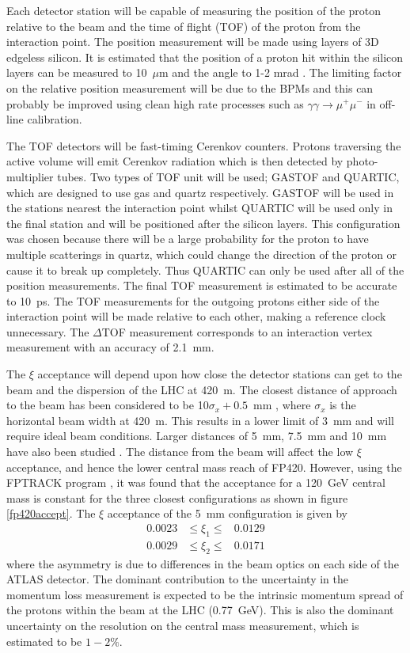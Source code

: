 Each detector station will be capable of measuring the position of the proton relative to the beam and the time of flight (TOF) of the proton from the interaction point.
The position measurement will be made using layers of 3D edgeless silicon. It is estimated that the position of a proton hit within the silicon layers can be measured to 10~$\mu$m and the angle to 1-2 mrad \cite{Cox:2005tb}. The limiting factor on the relative position measurement will be due to the BPMs and this can probably be improved using clean high rate processes such as $\gamma \gamma \rightarrow \mu^{+} \mu^{-}$ in off-line calibration.

The TOF detectors will be fast-timing Cerenkov counters. Protons traversing the active volume will emit Cerenkov radiation which is then detected by photo-multiplier tubes. Two types of TOF unit will be used; GASTOF and QUARTIC, which are designed to use gas and quartz respectively. GASTOF will be used in the stations nearest the interaction point whilst QUARTIC will be used only in the final station and will be positioned after the silicon layers. This configuration was chosen because there will be a large probability for the proton to have multiple scatterings in  quartz, which could change the direction of the proton or cause it to break up completely. Thus QUARTIC can only be used after all of the position measurements.
The final TOF measurement is estimated to be accurate to 10~ps. The TOF measurements for the outgoing protons either side of the interaction point will be made relative to each other, making a reference clock unnecessary. The $\Delta$TOF measurement
corresponds to an interaction vertex measurement with an accuracy of 2.1~mm.

The $\xi$ acceptance will depend upon how close the detector stations can get to the beam and the dispersion of the LHC at 420~m. The closest distance of approach to the beam has been considered to be 10$\sigma_x + 0.5$~mm \cite{Alekhin:2005dy:TOTEM},
where $\sigma_x$ is the horizontal beam width at 420~m. This results in a lower limit of 3~mm and will require ideal beam conditions. Larger distances of 5~mm, 7.5~mm and 10~mm have also been studied \cite{Cox:2005tb}. The distance from the beam will affect the low $\xi$ acceptance, and hence the lower central mass reach of FP420. However, using the FPTRACK program \cite{PeterBusseyAcceptance}, it was found that the acceptance for a 120~GeV central mass is constant for the three closest configurations as shown in figure \ref{fp420accept}. The $\xi$ acceptance of the 5~mm configuration is given \cite{PeterBusseyAcceptance} by %
\begin{eqnarray}
0.0023 & \leq \xi_1 \leq & 0.0129 \nonumber \\
0.0029 & \leq \xi_2 \leq & 0.0171 
\end{eqnarray}
where the asymmetry is due to differences in the beam optics on each side of the ATLAS detector. The dominant contribution to the uncertainty in the momentum loss measurement is expected to be the intrinsic momentum spread of the protons within the beam at the LHC (0.77~GeV). This is also the dominant uncertainty on the resolution on the central mass measurement, which is estimated to be $1-2\%$. 

